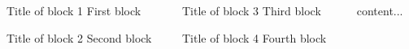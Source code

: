 \documentclass{beamer}
\begin{document}
%
%
%
\begin{frame}


\vspace{15cm}


\begin{columns}
\begin{column}{0.3\textwidth}
\begin{block}{Title of block 1}
First block
\end{block}
\begin{block}{Title of block 2}
Second block
\end{block}

\end{column}
\begin{column}{0.3\textwidth}
\begin{block}{Title of block 3}
Third block
\end{block}
\begin{block}{Title of block 4}
Fourth block
\end{block}
\end{column}
\begin{column}{0.3\textwidth}
content...
\end{column}
\end{columns}
\end{frame}
\end{document}
